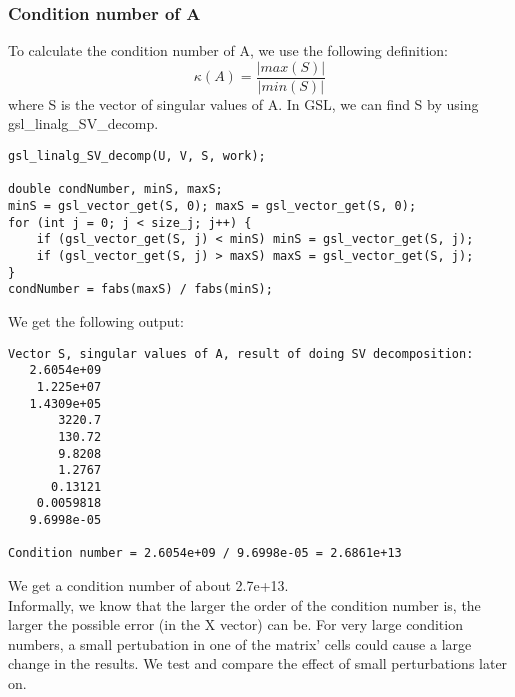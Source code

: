 \documentclass[11pt, a4paper, titlepage, openright]{article}
\begin{document}
    \subsubsection{Condition number of A}
    To calculate the condition number of A, we use the following definition: \[\kappa(A)= \frac{|max(S)|}{|min(S)|} \]
    where S is the vector of singular values of A. In GSL, we can find S by using gsl\_linalg\_SV\_decomp.
\begin{lstlisting}
gsl_linalg_SV_decomp(U, V, S, work);

double condNumber, minS, maxS;
minS = gsl_vector_get(S, 0); maxS = gsl_vector_get(S, 0);
for (int j = 0; j < size_j; j++) {
    if (gsl_vector_get(S, j) < minS) minS = gsl_vector_get(S, j);
    if (gsl_vector_get(S, j) > maxS) maxS = gsl_vector_get(S, j);
}
condNumber = fabs(maxS) / fabs(minS);
\end{lstlisting}
    We get the following output:
\begin{lstlisting}
Vector S, singular values of A, result of doing SV decomposition:
   2.6054e+09
    1.225e+07
   1.4309e+05
       3220.7
       130.72
       9.8208
       1.2767
      0.13121
    0.0059818
   9.6998e-05

Condition number = 2.6054e+09 / 9.6998e-05 = 2.6861e+13
\end{lstlisting}
    We get a condition number of about 2.7e+13. \\
    Informally, we know that the larger the order of the condition number is, the larger the possible error (in the X vector) can be.
    For very large condition numbers, a small pertubation in one of the matrix' cells could cause a large change in the results.
    We test and compare the effect of small perturbations later on.
\end{document}
